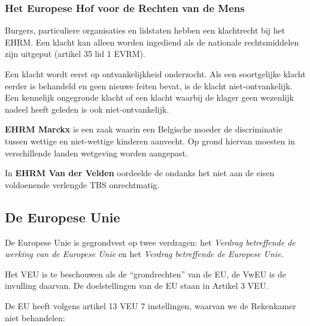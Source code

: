 \documentclass{article}
\begin{document}
\subsubsection{Het Europese Hof voor de Rechten van de Mens}

Burgers, particuliere organisaties en lidstaten hebben een klachtrecht bij het
EHRM. Een klacht kan alleen worden ingediend als de nationale rechtsmiddelen
zijn uitgeput (artikel 35 lid 1 EVRM).

Een klacht wordt eerst op ontvankelijkheid onderzocht. Als een soortgelijke
klacht eerder is behandeld en geen nieuwe feiten bevat, is de klacht
niet-ontvankelijk. Een kennelijk ongegronde klacht of een klacht waarbij de
klager geen wezenlijk nadeel heeft geleden is ook niet-ontvankelijk.

\textbf{EHRM Marckx} is een zaak waarin een Belgische moeder de discriminatie
tussen wettige en niet-wettige kinderen aanvecht. Op grond hiervan moesten in
verschillende landen wetgeving worden aangepast.

In \textbf{EHRM Van der Velden} oordeelde de ondanks het niet aan de eisen
voldoenende verlengde TBS onrechtmatig.

\subsection{De Europese Unie}

De Europese Unie is gegrondvest op twee verdragen: het \emph{Verdrag
betreffende de werking van de Europese Unie} en het \emph{Verdrag betreffende
de Europese Unie}.

Het VEU is te beschouwen als de ``grondrechten'' van de EU, de VwEU is de
invulling daarvan. De doelstellingen van de EU staan in Artikel 3 VEU.

De EU heeft volgens artikel 13 VEU 7 instellingen, waarvan we de Rekenkamer
niet behandelen:
\end{document}
